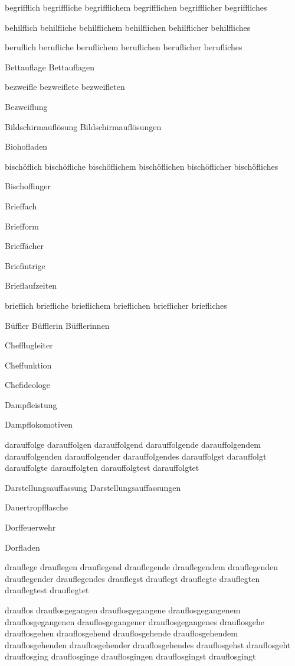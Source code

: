 begrifflich begriffliche begrifflichem begrifflichen begrifflicher begriffliches

behilflich behilfliche behilflichem behilflichen behilflicher behilfliches

beruflich berufliche beruflichem beruflichen beruflicher berufliches

Bettauflage Bettauflagen

bezweifle bezweiflete bezweifleten

Bezweiflung

Bildschirmauflösung Bildschirmauflösungen

Biohofladen

bischöflich bischöfliche bischöflichem bischöflichen bischöflicher bischöfliches

Bischoffinger

Brieffach

Briefform

Brieffächer

Briefintrige

Brieflaufzeiten

brieflich briefliche brieflichem brieflichen brieflicher briefliches

Büffler Büfflerin Büfflerinnen

Chefflugleiter

Cheffunktion

Chefideologe

Dampfleistung

Dampflokomotiven

darauffolge darauffolgen darauffolgend darauffolgende darauffolgendem darauffolgenden darauffolgender darauffolgendes darauffolgst darauffolgt darauffolgte darauffolgten darauffolgtest darauffolgtet

Darstellungsauffassung Darstellungsauffassungen

Dauertropfflasche

Dorffeuerwehr

Dorfladen

drauflege drauflegen drauflegend drauflegende drauflegendem drauflegenden drauflegender drauflegendes drauflegst drauflegt drauflegte drauflegten drauflegtest drauflegtet

drauflos drauflosgegangen drauflosgegangene drauflosgegangenem drauflosgegangenen drauflosgegangener drauflosgegangenes drauflosgehe drauflosgehen drauflosgehend drauflosgehende drauflosgehendem drauflosgehenden drauflosgehender drauflosgehendes drauflosgehst drauflosgeht drauflosging drauflosginge drauflosgingen drauflosgingst drauflosgingt

